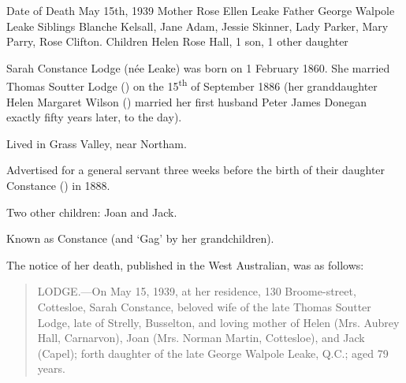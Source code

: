 
Date of Death 	May 15th, 1939
Mother 	Rose Ellen Leake
Father 	George Walpole Leake
Siblings 	Blanche Kelsall, Jane Adam, Jessie Skinner, Lady Parker, Mary Parry, Rose Clifton.
Children 	Helen Rose Hall, 1 son, 1 other daughter

Sarah Constance Lodge (n\'{e}e Leake) was born on 1 February 1860. She married Thomas Soutter Lodge () on the 15\textsuperscript{th} of September 1886 (her granddaughter Helen Margaret Wilson () married her first husband Peter James Donegan exactly fifty years later, to the day\cite{HMWnote}).

Lived in Grass Valley, near Northam.\cite{ServantAd}

Advertised for a general servant three weeks before the birth of their daughter Constance () in 1888.\cite{ServantAd}

Two other children: Joan and Jack.\cite{SCLdeathNotice}

Known as Constance (and `Gag' by her grandchildren).

The notice of her death, published in the West Australian, was as follows:\cite{SCLdeathNotice}

\begin{quotation}
LODGE.---On May 15, 1939, at her residence, 130 Broome-street, Cottesloe, Sarah Constance, beloved wife of the late Thomas Soutter Lodge, late of Strelly, Busselton, and loving mother of Helen (Mrs. Aubrey Hall, Carnarvon), Joan (Mrs. Norman Martin, Cottesloe), and Jack (Capel); forth daughter of the late George Walpole Leake, Q.C.; aged 79 years.
\end{quotation}
